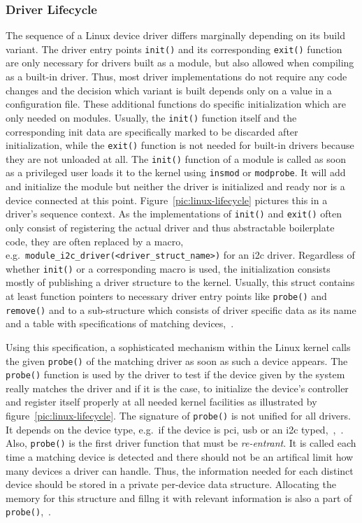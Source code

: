 \subsubsection*{Driver Lifecycle}
The sequence of a Linux device driver differs marginally depending on its build variant.
The driver entry points \texttt{init()} and its corresponding \texttt{exit()} function are only necessary for drivers built as a module, but also allowed when compiling as a built-in driver.
Thus, most driver implementations do not require any code changes and the decision which variant is built depends only on a value in a configuration file.
These additional functions do specific initialization which are only needed on modules.
Usually, the \texttt{init()} function itself and the corresponding init data are specifically marked to be discarded after initialization, while the \texttt{exit()} function is not needed for built-in drivers because they are not unloaded at all\cite{lfd430}.
The \texttt{init()} function of a module is called as soon as a privileged user loads it to the kernel using \texttt{insmod} or \texttt{modprobe}.
It will add and initialize the module but neither the driver is initialized and ready nor is a device connected at this point.
Figure~\ref{pic:linux-lifecycle} pictures this in a driver's sequence context.
As the implementations of \texttt{init()} and \texttt{exit()} often only consist of registering the actual driver and thus abstractable boilerplate code, they are often replaced by a macro, e.g.\ \texttt{module\_i2c\_driver(<driver\_struct\_name>)} for an \ac{i2c} driver.
Regardless of whether \texttt{init()} or a corresponding macro is used, the initialization consists mostly of publishing a driver structure to the kernel.
Usually, this struct contains at least function pointers to necessary driver entry points like \texttt{probe()} and \texttt{remove()} and to a sub-structure which consists of driver specific data as its name and a table with specifications of matching devices\cite{quade2016Linux},~\cite{lfd430}. 

Using this specification, a sophisticated mechanism within the Linux kernel calls the given \texttt{probe()} of the matching driver as soon as such a device appears.
The \texttt{probe()} function is used by the driver to test if the device given by the system really matches the driver and if it is the case, to initialize the device's controller and register itself properly at all needed kernel facilities as illustrated by figure~\ref{pic:linux-lifecycle}.
The signature of \texttt{probe()} is not unified for all drivers.
It depends on the device type, e.g.\ if the device is \ac{pci}, \ac{usb} or an \ac{i2c} typed\cite{lfd430},~\cite{quade2016Linux},~\cite{corbet2005linux}.
Also, \texttt{probe()} is the first driver function that must be \textit{re-entrant}.
It is called each time a matching device is detected and there should not be an artifical limit how many devices a driver can handle. 
Thus, the information needed for each distinct device should be stored in a private per-device data structure.
Allocating the memory for this structure and fillng it with relevant information is also a part of \texttt{probe()}\cite{lfd430},~\cite{quade2016Linux}.


